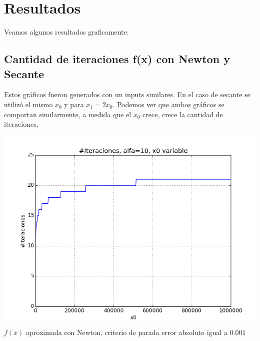 \section{Resultados}



Veamos algunos resultados graficamente:

\subsection{Cantidad de iteraciones f(x) con Newton y Secante}
Estos gráficos fueron generados con un inputs similares. En el caso de secante se utilizó el mismo $x_0$ y para $x_1 = 2x_0$. Podemos ver que ambos gráficos se comportan similarmente, a medida que el $x_0$ crece, crece la cantidad de iteraciones.\\

\begin{center}
\includegraphics[scale=0.5]{graficos/iteraciones-f-newton-alfa_fijo-absoluto-0.001-alejando.png}\\
$f(x)$ aproximada con Newton, criterio de parada error absoluto igual a $0.001$
\end{center}

